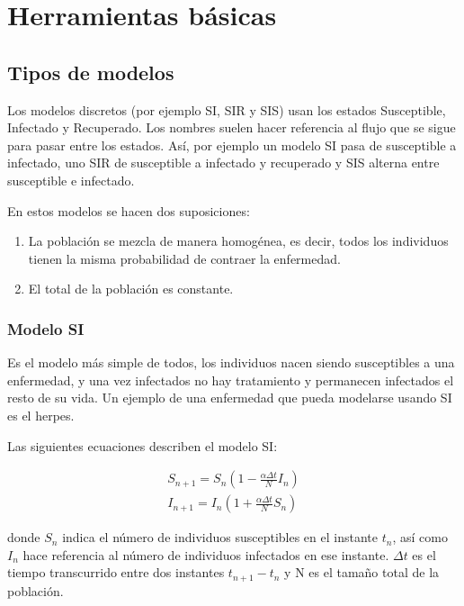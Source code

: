 \chapter{Herramientas básicas}

\section{Tipos de modelos}

Los modelos discretos (por ejemplo SI, SIR y SIS) usan los estados Susceptible, Infectado y Recuperado. Los nombres suelen hacer referencia al flujo que se sigue para pasar entre los estados. Así, por ejemplo un modelo SI pasa de susceptible a infectado, uno SIR de susceptible a infectado y recuperado y SIS alterna entre susceptible e infectado.

En estos modelos se hacen dos suposiciones:
\begin{enumerate}
\item La población se mezcla de manera homogénea, es decir, todos los individuos tienen la misma probabilidad de contraer la enfermedad.
\item El total de la población es constante.
\end{enumerate}

\subsection{Modelo SI}
Es el modelo más simple de todos, los individuos nacen siendo susceptibles a una enfermedad, y una vez infectados no hay tratamiento y permanecen infectados el resto de su vida.
Un ejemplo de una enfermedad que pueda modelarse usando SI es el herpes.

Las siguientes ecuaciones describen el modelo SI:

\begin{equation}
\label{eqn: SI}
\begin{aligned}
S_{n+1}=S_n\left( 1-\frac{\alpha\Delta t}{N}I_n\right) \\
I_{n+1}=I_n\left( 1+\frac{\alpha\Delta t}{N}S_n\right)
\end{aligned}
\end{equation}

donde $S_n$ indica el número de individuos susceptibles en el instante $t_n$, así como $I_n$ hace referencia al número de individuos infectados en ese instante. $\Delta t$ es el tiempo transcurrido entre dos instantes $t_{n+1}-t_n$ y N es el tamaño total de la población.

